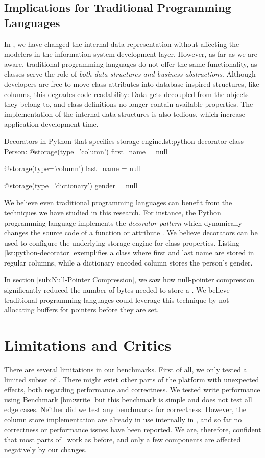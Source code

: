 \subsection{Implications for Traditional Programming Languages}
\label{sub:Implications for Traditional Programming Languages}
In \mde, we have changed the internal data representation without affecting the modelers in the information system development layer. However, as far as we are aware, traditional programming languages do not offer the same functionality, as classes serve the role of \textit{both data structures and business abstractions}. Although developers are free to move class attributes into database-inspired structures, like columns, this degrades code readability: Data gets decoupled from the objects they belong to, and class definitions no longer contain available properties. The implementation of the internal data structures is also tedious, which increase application development time.

\begin{pythoncode}{Decorators in Python that specifies storage engine.}{lst:python-decorator}
class Person:
    @storage(type='column')
    first_name = null

    @storage(type='column')
    last_name = null

    @storage(type='dictionary')
    gender = null
\end{pythoncode}
We believe even traditional programming languages can benefit from the techniques we have studied in this research. For instance, the Python programming language implements the \textit{decorator pattern} which dynamically changes the source code of a function or attribute \cite{noauthor_undated-aq}. We believe decorators can be used to configure the underlying storage engine for class properties. Listing \ref{lst:python-decorator} exemplifies a  class where first and last name are stored in regular columns, while a dictionary encoded column stores the person's gender.

In section \ref{sub:Null-Pointer Compression}, we saw how null-pointer compression significantly reduced the number of bytes needed to store a . We believe traditional programming languages could leverage this technique by not allocating buffers for pointers before they are set.

\section{Limitations and Critics}
\label{sec:Limitations and Critics}
There are several limitations in our benchmarks. First of all, we only tested a limited subset of \gap. There might exist other parts of the platform with unexpected effects, both regarding performance and correctness. We tested write performance using Benchmark \ref{bm:write} but this benchmark is simple and does not test all edge cases. Neither did we test any benchmarks for correctness. However, the column store implementation are already in use internally in \genus, and so far no correctness or performance issues have been reported. We are, therefore, confident that most parts of \gap~work as before, and only a few components are affected negatively by our changes.

